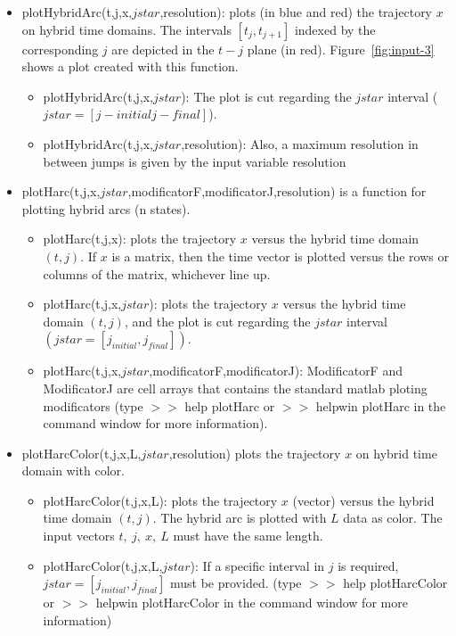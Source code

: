 \documentclass{article}
\begin{document}
\begin{itemize}
\item plotHybridArc(t,j,x,$jstar$,resolution): plots (in blue and red) the trajectory $x$ on hybrid
time domains. The intervals $[t_j,t_{j+1}]$ indexed by the
corresponding $j$ are depicted in the $t-j$ plane (in red). Figure~\ref{fig:input-3} shows a plot created with this function.
 \begin{itemize}
 	\item plotHybridArc(t,j,x,$jstar$): The plot is cut regarding the $jstar$ interval ($jstar = [j-initial j-final]$).
	\item plotHybridArc(t,j,x,$jstar$,resolution): Also, a maximum resolution in between jumps is given by the input variable resolution
 \end{itemize}

\item plotHarc(t,j,x,$jstar$,modificatorF,modificatorJ,resolution) is a function for plotting hybrid arcs (n states).
\begin{itemize}
\item plotHarc(t,j,x): plots the trajectory $x$ versus the hybrid time domain $(t,j)$. If $x$ is a matrix, then the time vector is plotted versus the rows or columns of the matrix, whichever line up.
\item plotHarc(t,j,x,$jstar$): plots the trajectory $x$ versus the hybrid time domain $(t,j)$, and the plot is cut regarding the $jstar$ interval $(jstar = [j_{initial},j_{final}])$.
\item plotHarc(t,j,x,$jstar$,modificatorF,modificatorJ): ModificatorF and ModificatorJ are cell arrays that contains the standard matlab ploting modificators (type $>>$ help plotHarc or $>>$ helpwin plotHarc in the command window for more information).
\end{itemize}

\item plotHarcColor(t,j,x,L,$jstar$,resolution) plots the trajectory $x$ on hybrid time domain with color.
\begin{itemize}
\item plotHarcColor(t,j,x,L): plots the trajectory $x$ (vector) versus the hybrid time domain $(t,j)$. The hybrid arc is plotted with $L$ data as color. The input vectors $t,\ j,\ x,\ L$ must have the same length. 
\item      plotHarcColor(t,j,x,L,$jstar$): If a specific interval in $j$ is required, $jstar = [j_{initial},
 j_{final}]$ must be provided. (type $>>$ help plotHarcColor or $>>$ helpwin plotHarcColor in the command window for more information)
\end{itemize}


\end{itemize}
\end{document}
